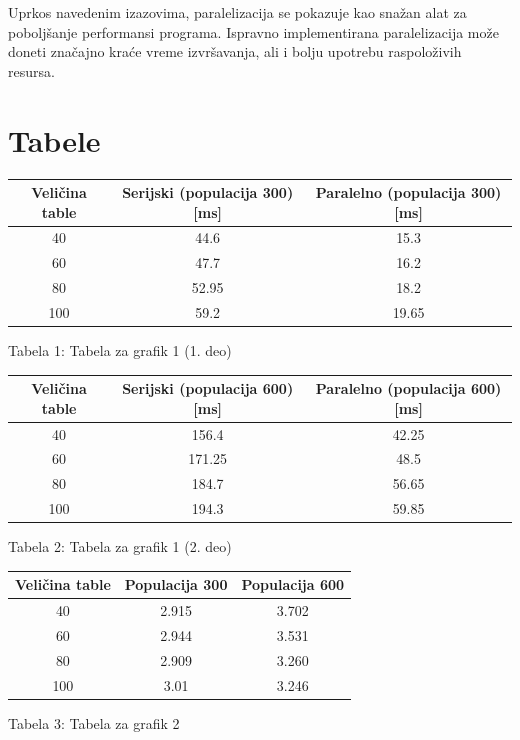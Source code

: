 \documentclass[12pt, a4paper]{article}
\begin{document}
	Uprkos navedenim izazovima, paralelizacija se pokazuje kao snažan alat za poboljšanje performansi programa. Ispravno implementirana paralelizacija može doneti značajno kraće vreme izvršavanja, ali i bolju upotrebu raspoloživih resursa.
	
	\newpage
	
	\section{Tabele}
	
	\begin{center}
		\begin{tabular}{||c c c||} 
			\hline
			Veličina table & Serijski (populacija 300) [ms] & Paralelno (populacija 300) [ms] \\ [0.5ex] 
			\hline\hline
			40 & 44.6 & 15.3 \\ 
			\hline
			60 & 47.7 & 16.2 \\
			\hline
			80 & 52.95 & 18.2 \\
			\hline
			100 & 59.2 & 19.65 \\
			\hline
		\end{tabular}
	\end{center}
	\begin{center}
		Tabela 1: Tabela za grafik 1 (1. deo)
	\end{center}

	\begin{center}
		\begin{tabular}{||c c c||} 
			\hline
			Veličina table & Serijski (populacija 600) [ms] & Paralelno (populacija 600) [ms] \\ [0.5ex] 
			\hline\hline
			40 & 156.4 & 42.25 \\ 
			\hline
			60 & 171.25 & 48.5 \\
			\hline
			80 & 184.7 & 56.65 \\
			\hline
			100 & 194.3 & 59.85 \\
			\hline
		\end{tabular}
	\end{center}
	\begin{center}
		Tabela 2: Tabela za grafik 1 (2. deo)
	\end{center}

	\begin{center}
		\begin{tabular}{||c c c||} 
			\hline
			Veličina table & Populacija 300 & Populacija 600 \\ [0.5ex] 
			\hline\hline
			40 & 2.915 & 3.702 \\ 
			\hline
			60 & 2.944 & 3.531 \\
			\hline
			80 & 2.909 & 3.260 \\
			\hline
			100 & 3.01 & 3.246 \\
			\hline
		\end{tabular}
	\end{center}
	\begin{center}
		Tabela 3: Tabela za grafik 2
	\end{center}
\end{document}
